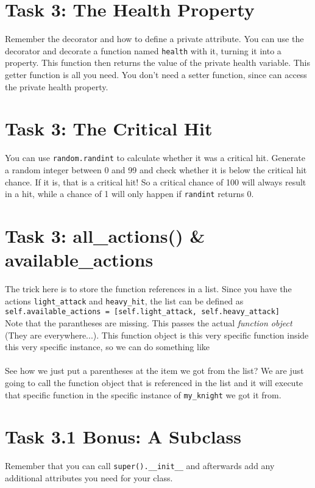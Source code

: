 \section{Task 3: The Health Property}
Remember the  decorator and how to define a private attribute.
You can use the decorator and decorate a function named \texttt{health} with it,
turning it into a property. This function then returns the value of the private health
variable. This getter function is all you need. You don't need a setter function, since
 can access the private health property.
\pagebreak

\section{Task 3: The Critical Hit}
You can use  \texttt{random.randint} to calculate whether it was a critical hit.
Generate a random integer between 0 and 99 and check whether it is below the
critical hit chance. If it is, that is a critical hit! So a critical chance of
100 will always result in a hit, while a chance of 1 will only happen if 
\texttt{randint} returns 0.

\pagebreak

\section{Task 3: all\_actions() \& available\_actions}
The trick here is to store the function references in a list. Since you have the
actions \texttt{light\_attack} and \texttt{heavy\_hit}, the list can be defined as\\
\texttt{self.available\_actions = [self.light\_attack, self.heavy\_attack]}\\
Note that the parantheses are missing. This passes the actual \textit{function object}
(They are everywhere...). This function object is this very specific function inside
this very specific instance, so we can do something like\\
\\
See how we just put a parentheses at the item we got from the list? We are just going
to call the function object that is referenced in the list and it will execute that
specific function in the specific instance of \texttt{my\_knight} we got it from.

\pagebreak

\section{Task 3.1 Bonus: A Subclass}
Remember that you can call \texttt{super().\_\_init\_\_} and afterwards add any
additional attributes you need for your class.

